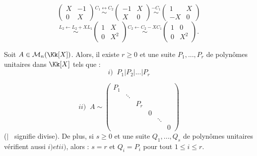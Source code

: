 \documentclass[class=report,crop=false]{standalone}
\newcommand{\sta}{\stackrel}
\begin{document}
\begin{exemple}
\[\left(\begin{array}{cc}
X&-1\\
0& X
\end{array}\right) \sta{C_1\leftrightarrow C_2}{\sim} \left(\begin{array}{cc}
-1&X\\
X&0
\end{array}\right) \sta{-C_1}{\sim}\left(\begin{array}{cc}
1&X\\
-X&0
\end{array}\right) \]
\[\sta{L_2 \leftarrow L_2 + X L_1}{\sim}\left(\begin{array}{cc}
1&X\\
0&X^2
\end{array}\right)\sta{C_2\leftarrow C_2-X C_1}{\sim} \left(\begin{array}{cc}
1&0\\
0& X^2
\end{array}\right).\]
\end{exemple}

\begin{theoreme}
Soit $A \in \mathcal{M}_n(\Kk[X])$. Alors, il existe $r \ge 0$ et une suite $P_1,...,P_r$ de polynômes unitaires dans $\Kk[X]$ tels que : 
\[i)\;\;P_1 | P_2 |...|P_r \]

\[ii)\;\;A \sim \left(\begin{array}{cccccc}
P_1 &&&&&\\
& \ddots&&&&\\
&&P_r&&&\\
&&&0&&\\
&&&&\ddots&\\
&&&&&0
\end{array}
\right)\]
(\og $|$ \fg\ signifie divise).
De plus, si $s \ge 0$ et une suite $Q_1,...,Q_s$ de polynômes unitaires vérifient aussi $i) et ii)$, alors : $s=r$ et $Q_i = P_i$ pour tout $1 \le i \le r$.
\end{theoreme}
\end{document}
